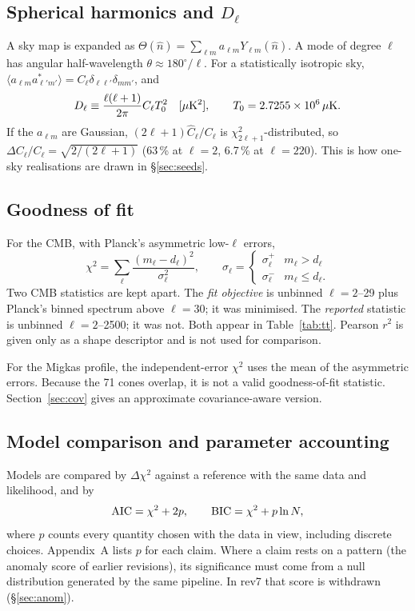 \documentclass[11pt]{article}
\begin{document}
\subsection{Spherical harmonics and $D_\ell$}\label{sec:harm}
A sky map is expanded as $\Theta(\hat n)=\sum_{\ell m}a_{\ell m}Y_{\ell m}(\hat n)$. A mode of degree $\ell$ has angular half-wavelength $\theta\approx180^\circ/\ell$. For a statistically isotropic sky, $\langle a_{\ell m}a^*_{\ell'm'}\rangle=C_\ell\delta_{\ell\ell'}\delta_{mm'}$, and
\begin{equation}
D_\ell\equiv\frac{\ell(\ell+1)}{2\pi}C_\ell T_0^2\quad[\mu{\rm K}^2],\qquad T_0=2.7255\times10^6\,\mu{\rm K}. \label{eq:Dl}
\end{equation}
If the $a_{\ell m}$ are Gaussian, $(2\ell+1)\hat C_\ell/C_\ell$ is $\chi^2_{2\ell+1}$-distributed, so $\Delta C_\ell/C_\ell=\sqrt{2/(2\ell+1)}$ (63\,\% at $\ell=2$, 6.7\,\% at $\ell=220$). This is how one-sky realisations are drawn in \S\ref{sec:seeds}.

\subsection{Goodness of fit}\label{sec:gof}
For the CMB, with Planck's asymmetric low-$\ell$ errors,
\begin{equation}
\chi^2=\sum_\ell\frac{(m_\ell-d_\ell)^2}{\sigma_\ell^2},\qquad \sigma_\ell=\begin{cases}\sigma^+_\ell & m_\ell>d_\ell\\ \sigma^-_\ell & m_\ell\le d_\ell.\end{cases}\label{eq:chi2}
\end{equation}
Two CMB statistics are kept apart. The \emph{fit objective} is unbinned $\ell=2$--29 plus Planck's binned spectrum above $\ell=30$; it was minimised. The \emph{reported} statistic is unbinned $\ell=2$--2500; it was not. Both appear in Table~\ref{tab:tt}. Pearson $r^2$ is given only as a shape descriptor and is not used for comparison.

For the Migkas profile, the independent-error $\chi^2$ uses the mean of the asymmetric errors. Because the 71 cones overlap, it is not a valid goodness-of-fit statistic. Section~\ref{sec:cov} gives an approximate covariance-aware version.

\subsection{Model comparison and parameter accounting}\label{sec:compare}
Models are compared by $\Delta\chi^2$ against a reference with the same data and likelihood, and by
\begin{equation}
{\rm AIC}=\chi^2+2p,\qquad {\rm BIC}=\chi^2+p\ln N,
\end{equation}
where $p$ counts every quantity chosen with the data in view, including discrete choices. Appendix~A lists $p$ for each claim. Where a claim rests on a pattern (the anomaly score of earlier revisions), its significance must come from a null distribution generated by the same pipeline. In rev7 that score is withdrawn (\S\ref{sec:anom}).
\end{document}
